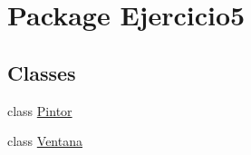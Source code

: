 \hypertarget{namespace_ejercicio5}{}\section{Package Ejercicio5}
\label{namespace_ejercicio5}
\subsection*{Classes}
\begin{DoxyCompactItemize}
\item 
class \mbox{\hyperlink{class_ejercicio5_1_1_pintor}{Pintor}}
\item 
class \mbox{\hyperlink{class_ejercicio5_1_1_ventana}{Ventana}}
\end{DoxyCompactItemize}
